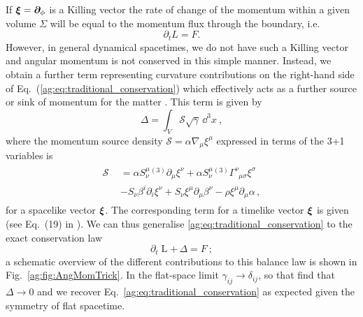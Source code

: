 If $\boldsymbol{\xi} = \boldsymbol{\partial}_\phi$ is a Killing vector the rate of change of the momentum
within a given volume $\Sigma$ will be equal to the momentum flux through the
boundary, i.e.
\begin{equation} \label{ag:eq:traditional_conservation}
    \partial_t {L} = {F}.
\end{equation}
However, in general dynamical spacetimes, we do not have such
a Killing vector and angular momentum is not conserved in this simple manner.
Instead, we obtain a further term representing curvature contributions on the right-hand side of Eq.~(\ref{ag:eq:traditional_conservation})
which effectively acts as a further source or sink of momentum for the matter \cite{Croft:2022gks,Clough:2021qlv}. This term is given by
\begin{equation}
    \mathbin{{\Delta = \int_{V} \mathcal{S} \sqrt{\gamma }\,
    \dd^3x}}~,
\end{equation}
where the momentum source density $\mathcal{S}=\alpha\nabla_{\mu}\xi^{\mu}$ expressed in terms
of the 3+1 variables is
\begin{align}
    \begin{split}\mathcal{S} &= \alpha S^\mu_{\nu}{}^{(3)}\partial_\mu \xi^\nu + \alpha S^\mu_{\nu} {}^{(3)}\Gamma^\nu_{\,\,\,\mu \sigma} \xi^\sigma \\ \quad &- S_\nu \beta^i \partial_i \xi^\nu  + S_\nu \xi^\mu \partial_\mu \beta^\nu - \rho \xi^\mu \partial_\mu \alpha\,, \end{split}
\end{align}
for a spacelike vector $\boldsymbol\xi$. The corresponding term
for a timelike vector $\boldsymbol\xi$ is given (see Eq.~(19) in \cite{Clough:2021qlv}).
We can thus generalise \ref{ag:eq:traditional_conservation} to the exact conservation law
\begin{equation}
    \partial_t\mathbin{{L}} +\,
    \mathbin{{\Delta}} =
    \mathbin{F}~;\label{ag:eqn:conserved_ang}
\end{equation}
a schematic overview of the different contributions to this balance
law is shown in Fig.~\ref{ag:fig:AngMomTrick}. In the flat-space limit $\gamma_{ij}
\rightarrow \delta_{ij}$, so that
find that ${{\Delta}}\rightarrow 0$ and we recover Eq.~\ref{ag:eq:traditional_conservation} as expected given the
symmetry of flat spacetime.

